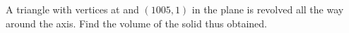 A triangle with vertices at   and $(1005,1)$ in the plane is revolved all the way around the axis.  Find the volume of the solid thus obtained.